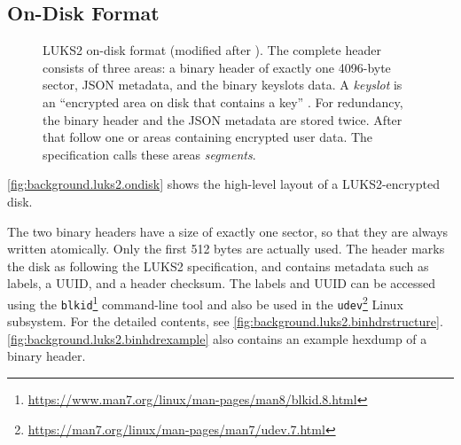\subsection{On-Disk Format}
\label{chap:background.luks2.ondisk}
\begin{figure}[htb!]
	\caption[
		LUKS2 on-disk format
	]{
		LUKS2 on-disk format (modified after \cite{Broz2018}). The complete header consists of three areas: a binary header of exactly one 4096-byte sector, JSON metadata, and the binary keyslots data. A \emph{keyslot} is an ``encrypted area on disk that contains a key'' \cite{Broz2018}. For redundancy, the binary header and the JSON metadata are stored twice. After that follow one or areas containing encrypted user data. The specification calls these areas \emph{segments}.
	}
	\label{fig:background.luks2.ondisk}
\end{figure}

\autoref{fig:background.luks2.ondisk} shows the high-level layout of a LUKS2-encrypted disk.

The two binary headers have a size of exactly one sector, so that they are always written atomically. Only the first 512 bytes are actually used. The header marks the disk as following the LUKS2 specification, and contains metadata such as labels, a UUID, and a header checksum. The labels and UUID can be accessed using the \texttt{blkid}\footnote{\label{fn:background.luks2.blkid} \url{https://www.man7.org/linux/man-pages/man8/blkid.8.html}} command-line tool and also be used in the \texttt{udev}\footnote{\label{fn:background.luks2.udev} \url{https://man7.org/linux/man-pages/man7/udev.7.html}} Linux subsystem. For the detailed contents, see \autoref{fig:background.luks2.binhdrstructure}. \autoref{fig:background.luks2.binhdrexample} also contains an example hexdump of a binary header.

